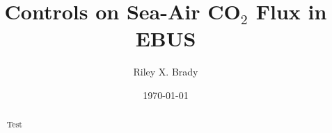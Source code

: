 \documentclass[]{article}
\title{Controls on Sea-Air CO$_{2}$ Flux in EBUS}
\author{Riley X. Brady}
\date{\today}
\begin{document}
\maketitle
\begin{abstract}
	Test
\end{abstract}


\section{}
\end{document}

